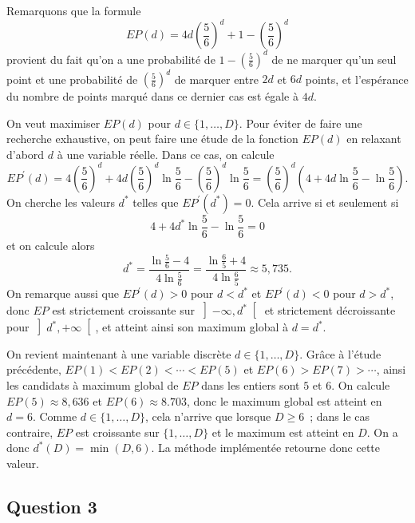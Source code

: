 \documentclass[a4paper,11pt]{amsart}
\theoremstyle{plain}
\begin{document}
Remarquons que la formule 
\begin{equation}
\label{EPd}
EP(d) = 4 d \left(\frac{5}{6}\right)^d + 1 - \left(\frac{5}{6}\right)^d
\end{equation}
provient du fait qu'on a une probabilité de $1 - \left(\frac{5}{6}\right)^d$ de ne marquer qu'un seul point et une probabilité de $\left(\frac{5}{6}\right)^d$ de marquer entre $2d$ et $6d$ points, et l'espérance du nombre de points marqué dans ce dernier cas est égale à $4d$.

On veut maximiser $EP(d)$ pour $d \in \{1, \dotsc, D\}$. Pour éviter de faire une recherche exhaustive, on peut faire une étude de la fonction $EP(d)$ en relaxant d'abord $d$ à une variable réelle. Dans ce cas, on calcule
\[
EP^\prime(d) = 4 \left(\frac{5}{6}\right)^d + 4 d \left(\frac{5}{6}\right)^d \ln \frac{5}{6} - \left(\frac{5}{6}\right)^d \ln \frac{5}{6} = \left(\frac{5}{6}\right)^d \left(4 + 4 d \ln \frac{5}{6} - \ln\frac{5}{6}\right).
\]
On cherche les valeurs $d^\ast$ telles que $EP^\prime(d^\ast) = 0$. Cela arrive si et seulement si
\[
4 + 4 d^\ast \ln \frac{5}{6} - \ln\frac{5}{6} = 0
\]
et on calcule alors
\[
d^\ast = \frac{\ln \frac{5}{6} - 4}{4 \ln \frac{5}{6}} = \frac{\ln \frac{6}{5} + 4}{4 \ln \frac{6}{5}} \approx 5,735.
\]
On remarque aussi que $EP^\prime(d) > 0$ pour $d < d^\ast$ et $EP^\prime(d) < 0$ pour $d > d^\ast$, donc $EP$ est strictement croissante sur $\left]-\infty, d^\ast\right[$ et strictement décroissante pour $\left]d^\ast, +\infty\right[$, et atteint ainsi son maximum global à $d = d^\ast$.

On revient maintenant à une variable discrète $d \in \{1, \dotsc, D\}$. Grâce à l'étude précédente, $EP(1) < EP(2) < \dotsb <EP(5)$ et $EP(6) > EP(7) > \dotsb$, ainsi les candidats à maximum global de $EP$ dans les entiers sont $5$ et $6$. On calcule $EP(5) \approx 8,636$ et $EP(6) \approx 8.703$, donc le maximum global est atteint en $d = 6$. Comme $d \in \{1, \dotsc, D\}$, cela n'arrive que lorsque $D \geq 6$~; dans le cas contraire, $EP$ est croissante sur $\{1, \dotsc, D\}$ et le maximum est atteint en $D$. On a donc $d^\ast(D) = \min(D, 6)$. La méthode implémentée retourne donc cette valeur.


\subsection{Question 3}
\end{document}
